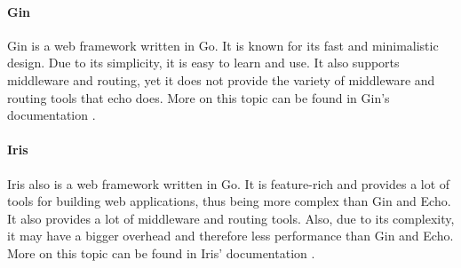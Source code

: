 \paragraph*{Gin}
Gin is a web framework written in Go.
It is known for its fast and minimalistic design.
Due to its simplicity, it is easy to learn and use.
It also supports middleware and routing, yet it does not provide the variety of middleware and routing tools that echo does.
More on this topic can be found in Gin's documentation \cite{GIN-DOC}.

\paragraph*{Iris}
Iris also is a web framework written in Go.
It is feature-rich and provides a lot of tools for building web applications, thus being more complex than Gin and Echo.
It also provides a lot of middleware and routing tools.
Also, due to its complexity, it may have a bigger overhead and therefore less performance than Gin and Echo.
More on this topic can be found in Iris' documentation \cite{IRI-DOC}.
